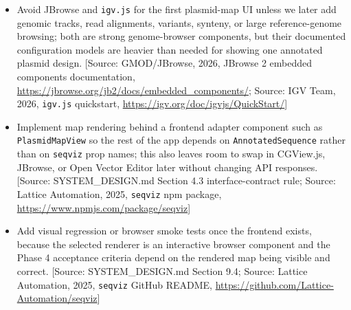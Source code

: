 \documentclass[11pt]{report}
\begin{document}
\begin{itemize}
\item Avoid JBrowse and \texttt{igv.js} for the first plasmid-map UI unless we later add genomic tracks, read alignments, variants, synteny, or large reference-genome browsing; both are strong genome-browser components, but their documented configuration models are heavier than needed for showing one annotated plasmid design. [Source: GMOD/JBrowse, 2026, JBrowse 2 embedded components documentation, \url{https://jbrowse.org/jb2/docs/embedded_components/}; Source: IGV Team, 2026, \texttt{igv.js} quickstart, \url{https://igv.org/doc/igvjs/QuickStart/}]
\item Implement map rendering behind a frontend adapter component such as \texttt{PlasmidMapView} so the rest of the app depends on \texttt{AnnotatedSequence} rather than on \texttt{seqviz} prop names; this also leaves room to swap in CGView.js, JBrowse, or Open Vector Editor later without changing API responses. [Source: SYSTEM\_DESIGN.md Section 4.3 interface-contract rule; Source: Lattice Automation, 2025, \texttt{seqviz} npm package, \url{https://www.npmjs.com/package/seqviz}]
\item Add visual regression or browser smoke tests once the frontend exists, because the selected renderer is an interactive browser component and the Phase 4 acceptance criteria depend on the rendered map being visible and correct. [Source: SYSTEM\_DESIGN.md Section 9.4; Source: Lattice Automation, 2025, \texttt{seqviz} GitHub README, \url{https://github.com/Lattice-Automation/seqviz}]
\end{itemize}
\end{document}
